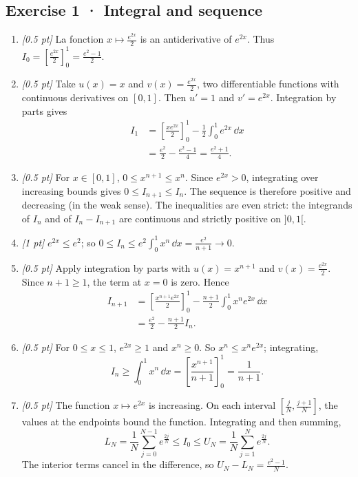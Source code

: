 \subsection*{Exercise 1 · Integral and sequence}\begin{enumerate}

\item \textit{[0.5 pt]} La fonction $x\mapsto \frac{e^{2x}}{2}$ is an antiderivative of $e^{2x}$. Thus $I_0=[\frac{e^{2x}}{2}]_0^1=\frac{e^{2}-1}{2}$.

\item \textit{[0.5 pt]} Take $u(x)=x$ and $v(x)=\frac{e^{2x}}{2}$, two differentiable functions with continuous derivatives on $[0,1]$. Then $u'=1$ and $v'=e^{2x}$. Integration by parts gives
\[\begin{aligned}I_1&=\left[\frac{xe^{2x}}{2}\right]_0^1-\frac{1}{2}\int_0^1e^{2x}\,\dd x\\&=\frac{e^{2}}{2}-\frac{e^{2}-1}{4}=\frac{e^{2}+1}{4}.\end{aligned}\]

\item \textit{[0.5 pt]} For $x\in[0,1]$, $0\le x^{n+1}\le x^n$. Since $e^{2x}>0$, integrating over increasing bounds gives $0\le I_{n+1}\le I_n$. The sequence is therefore positive and decreasing (in the weak sense). The inequalities are even strict: the integrands of $I_n$ and of $I_n-I_{n+1}$ are continuous and strictly positive on $]0,1[$.

\item \textit{[1 pt]} $e^{2x}\le e^{2}$; so $0\le I_n\le e^{2}\int_0^1x^n\,\dd x=\frac{e^{2}}{n+1}\to0$.

\item \textit{[0.5 pt]} Apply integration by parts with $u(x)=x^{n+1}$ and $v(x)=\frac{e^{2x}}{2}$. Since $n+1\ge1$, the term at $x=0$ is zero. Hence
\[\begin{aligned}I_{n+1}&=\left[\frac{x^{n+1}e^{2x}}{2}\right]_0^1-\frac{n+1}{2}\int_0^1x^ne^{2x}\,\dd x\\&=\frac{e^{2}}{2}-\frac{n+1}{2}I_n.\end{aligned}\]

\item \textit{[0.5 pt]} For $0\le x\le1$, $e^{2x}\ge1$ and $x^n\ge0$. So $x^n\le x^ne^{2x}$; integrating,
\[I_n\ge\int_0^1x^n\,\dd x=\left[\frac{x^{n+1}}{n+1}\right]_0^1=\frac{1}{n+1}.\]

\item \textit{[0.5 pt]} The function $x\mapsto e^{2x}$ is increasing. On each interval $[\frac{j}{N},\frac{j+1}{N}]$, the values at the endpoints bound the function. Integrating and then summing,
\[L_N=\frac{1}{N}\sum_{j=0}^{N-1}e^{\frac{2j}{N}}\le I_0\le U_N=\frac{1}{N}\sum_{j=1}^Ne^{\frac{2j}{N}}.\]
The interior terms cancel in the difference, so $U_N-L_N=\frac{e^{2}-1}{N}$.


\end{enumerate}
